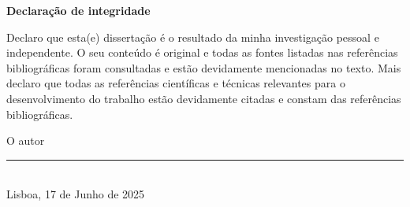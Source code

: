 \begin{center}
    \textbf{Declaração de integridade}
\end{center}

Declaro que esta(e) dissertação é o resultado da minha investigação pessoal e independente. O seu conteúdo é original e todas as fontes listadas nas referências bibliográficas foram consultadas e estão devidamente mencionadas no texto. Mais declaro que todas as referências científicas e técnicas relevantes para o desenvolvimento do trabalho estão devidamente citadas e constam das referências bibliográficas.

\begin{center}
O autor
\\[2em]

\rule{.5\textwidth}{1pt}
\\[.5em]
\fontsize{10}{12.2}
\selectfont
Lisboa, 17 de Junho de 2025
\end{center}